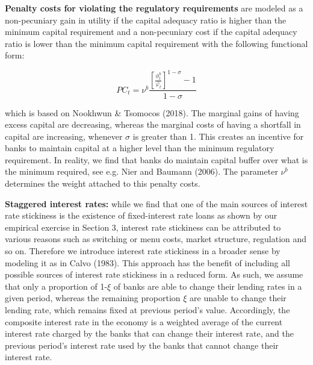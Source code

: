 \documentclass[12pt]{article}
\numberwithin{equation}{section}
\begin{document}

\textbf{Penalty costs for violating the regulatory requirements}  are modeled as a non-pecuniary gain in utility if the capital adequacy ratio is higher than the minimum capital requirement and a non-pecuniary cost if the capital adequacy ratio is lower than the minimum capital requirement with the following functional form: 

\begin{equation}
PC_t=\nu^b \frac{[\frac{\phi^b_t}{\bar{\varphi_t}}]^{1-\sigma}-1}{{1-\sigma}}
\end{equation}

which is based on Nookhwun \& Tsomocos (2018). The marginal gains of having excess capital are decreasing, whereas the marginal costs of having a shortfall in capital are increasing, whenever $\sigma$ is greater than 1. This creates an incentive for banks to maintain capital at a higher level than the minimum regulatory requirement. In reality, we find that banks do maintain capital buffer over what is the minimum required, see e.g. Nier and Baumann (2006). The parameter $\nu^b$ determines the weight attached to this penalty costs.



\textbf{Staggered interest rates:} while we find that one of the main sources of interest rate stickiness is the existence of fixed-interest rate loans as shown by our empirical exercise in Section 3, interest rate stickiness can be attributed to various reasons such as switching or menu costs, market structure, regulation and so on. Therefore we introduce interest rate stickiness in a broader sense by modeling it as in Calvo (1983). This approach has the benefit of including all possible sources of interest rate stickiness in a reduced form. As such, we assume that only a proportion of 1-$\xi$ of banks are able to change their lending rates in a given period, whereas the remaining proportion $\xi$ are unable to change their lending rate, which remains fixed at previous period's value. Accordingly, the composite interest rate in the economy is a weighted average of the current interest rate charged by the banks that can change their interest rate, and the previous period's interest rate used by the banks that cannot change their interest rate. 
\end{document}

